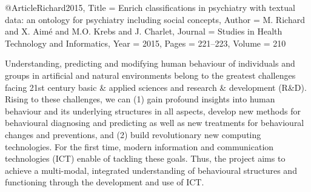 \documentclass[a4paper,UKenglish]{dagrep}
\begin{document}
\begin{thebibliography}{0}
@Article{Richard2015,
  Title                    = {Enrich classifications in psychiatry with textual
data: an ontology for psychiatry including social concepts},
  Author                   = {M. Richard and X. Aim\'{e} and M.O. Krebs and J.
Charlet},
  Journal                  = {Studies in {H}ealth {T}echnology and {I}nformatics},
  Year                     = {2015},
  Pages                    = {221--223},
  Volume                   = {210}
}
\end{thebibliography}


{}
\license
Understanding, predicting and modifying human behaviour of individuals and
groups in artificial and natural environments belong to the greatest challenges
facing 21st century basic \& applied sciences and research \& development
(R\&D). Rising to these challenges, we can (1) gain profound insights into human
behaviour and its underlying structures in all aspects, develop new methods for
behavioural diagnosing and predicting as well as new treatments for behavioural
changes and preventions, and (2) build revolutionary new computing technologies.
For the first time, modern information and communication technologies (ICT)
enable of tackling these goals. Thus, the project aims to achieve a multi-modal,
integrated understanding of behavioural structures and functioning through the
development and use of ICT. 
\end{document}
